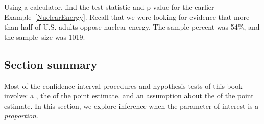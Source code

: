 \begin{exercisewrap}
\begin{nexercise}
Using a calculator, find the test statistic and p-value for the earlier Example~\ref{NuclearEnergy}.  Recall that we were looking for evidence that more than half of U.S. adults oppose nuclear energy.  The sample percent was 54\%, and the sample~size was 1019.\footnotemark
\end{nexercise}
\end{exercisewrap}


\D{\newpage}

\subsection*{Section summary}
\noindent Most of the confidence interval procedures and hypothesis tests of this book involve: a , the  of the point estimate, and an assumption about the  of the point estimate. In this section, we explore inference when the parameter of interest is a \emph{proportion}.

